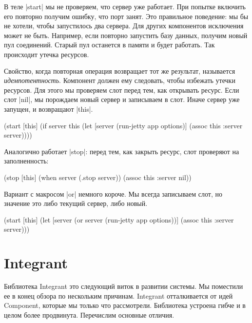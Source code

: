 В теле \spverb|start| мы не проверяем, что сервер уже работает. При попытке
включить его повторно получим ошибку, что порт занят. Это правильное поведение:
мы бы не хотели, чтобы запустилось два сервера. Для других компонентов
исключения может не быть. Например, если повторно запустить базу данных, получим
новый пул соединений. Старый пул останется в памяти и будет работать. Так
происходит утечка ресурсов.

Свойство, когда повторная операция возвращает тот же результат, называется
\emph{идемпотентность}. Компонент должен ему следовать, чтобы избежать утечки
ресурсов. Для этого мы проверяем слот перед тем, как открывать ресурс. Если слот
\spverb|nil|, мы порождаем новый сервер и записываем в слот. Иначе сервер уже
запущен, и возвращают \spverb|this|.

\begin{english}
  \begin{clojure}
(start [this]
  (if server
    this
    (let [server (run-jetty app options)]
      (assoc this :server server))))
  \end{clojure}
\end{english}

Аналогично работает \spverb|stop|: перед тем, как закрыть ресурс, слот проверяют
на заполненность:

\begin{english}
  \begin{clojure}
(stop [this]
  (when server
    (.stop server))
  (assoc this :server nil))
  \end{clojure}
\end{english}

Вариант с макросом \spverb|or| немного короче. Мы всегда записываем слот, но
значение это либо текущий сервер, либо новый.

\begin{english}
  \begin{clojure}
(start [this]
  (let [server (or server (run-jetty app options))]
    (assoc this :server server)))
  \end{clojure}
\end{english}

\section{Integrant}

Библиотека Integrant это
следующий виток в развитии системы. Мы поместили ее в конец обзора по нескольким
причинам. Integrant отталкивается от идей Component, которые мы только что
рассмотрели. Библиотека устроена гибче и в целом более продвинута. Перечислим
основные отличия.

